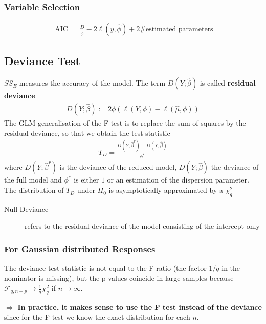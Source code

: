\subsubsection{Variable Selection}
\begin{align*}
\operatorname{AIC}
=
\frac{D}{\widehat\phi} -
2 \ell\left(y,\widehat\phi\right) +
2 \text{\#estimated parameters}
\end{align*}

\subsection{Deviance Test}
$SS_E$ measures the accuracy of the model.
The term $D(Y;\widehat\beta)$ is called \textbf{residual deviance}
\begin{align*}
D(Y;\widehat\beta)
:=
2\phi \left( \ell(Y, \phi) - \ell(\widehat\mu, \phi)\right)
\end{align*}
The GLM generalisation of the F test
is to replace the sum of squares by the residual deviance,
so that we obtain the test statistic
\begin{align*}
T_D
=
\frac{D(Y;\widehat\beta^r) - D(Y;\widehat\beta)}{\phi^*}
\end{align*}
where $D(Y;\widehat\beta^r)$ is the deviance of the reduced model,
$D(Y;\widehat\beta)$ the deviance of the full model and
$\phi^*$ is either $1$ or an estimation of the dispersion parameter.
The distribution of $T_D$ under $H_0$ is asymptotically approximated by a
$\chi_q^2$

\begin{description}
\item[Null Deviance] refers to the residual deviance of the model consisting of
the intercept only
\end{description}

\subsubsection{For Gaussian distributed Responses}
The deviance test statistic is not equal to the F ratio
(the factor $1/q$ in the nominator is missing),
but the p-values coincide in large samples because
$\mathcal{F}_{q,n-p} \rightarrow \frac{1}{q} \chi_q^2$
if $n \rightarrow \infty$.

$\Rightarrow$
\textbf{In practice, it makes sense to use the F test instead of the deviance}
since for the F test we know the exact distribution for each $n$.

